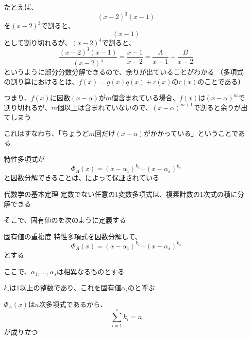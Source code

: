 \documentclass[../../../topic_linear-algebra]{subfiles}
\begin{document}
\br

たとえば、
\begin{equation*}
  (x-2)^3 (x-1)
\end{equation*}
を$(x-2)^3$で割ると、
\begin{equation*}
  (x - 1)
\end{equation*}
として割り切れるが、$(x-2)^4$で割ると、
\begin{equation*}
  \frac{(x-2)^3 (x-1)}{(x-2)^4} = \frac{x-1}{x-2} = \frac{A}{x-1} + \frac{B}{x-2}
\end{equation*}
というように部分分数分解できるので、余りが出ていることがわかる
（多項式の割り算におけるとは、$f(x) = g(x)q(x) + r(x)$の$r(x)$のことである）

\br

つまり、$f(x)$に因数$(x-\alpha)$が$m$個含まれている場合、$f(x)$は$(x-\alpha)^m$で割り切れるが、$m$個以上は含まれていないので、$(x-\alpha)^{m+1}$で割ると余りが出てしまう

これはすなわち、「ちょうど$m$回だけ$(x-\alpha)$がかかっている」ということである

\sectionline

特性多項式が
\begin{equation*}
  \Phi_A(x) = (x- \alpha_1)^{k_1}\cdots (x - \alpha_s)^{k_s}
\end{equation*}
と因数分解できることは、によって保証されている

\begin{theorem}{代数学の基本定理}
  定数でない任意の1変数多項式は、複素計数の1次式の積に分解できる
\end{theorem}

そこで、固有値のを次のように定義する

\begin{definition}{固有値の重複度}\label{def:algebraic-multiplicity}
  特性多項式を因数分解して、
  \begin{equation*}
    \Phi_A(x) = (x- \alpha_1)^{k_1}\cdots (x - \alpha_s)^{k_s}
  \end{equation*}
  とする

  ここで、$\alpha_1,\ldots, \alpha_s$は相異なるものとする

  $k_i$は1以上の整数であり、これを固有値$\alpha_i$のと呼ぶ

  $\Phi_A(x)$は$n$次多項式であるから、
  \begin{equation*}
    \sum_{i=1}^s k_i = n
  \end{equation*}
  が成り立つ
\end{definition}
\end{document}
